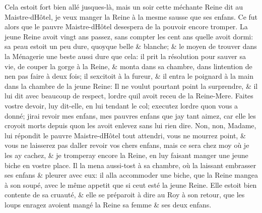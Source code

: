 \documentclass[14pt,a4paper]{memoir}
\begin{document}
\begin{otherlanguage}{french}
Cela estoit fort bien allé jusques-là, mais un soir cette méchante Reine
dit au Maistre-d\textquotesingle Hôtel, je veux manger la Reine à la
mesme sausse que ses enfans. Ce fut alors que le pauvre
Maistre-d\textquotesingle Hôtel desespera de la pouvoir encore tromper.
La jeune Reine avoit vingt ans passez, sans compter les cent ans
qu\textquotesingle elle avoit dormi: sa peau estoit un peu dure, quoyque
belle \& blanche; \& le moyen de trouver dans la Ménagerie une beste
aussi dure que cela: il prit la résolution pour sauver sa vie, de couper
la gorge à la Reine, \& monta dans sa chambre, dans
l\textquotesingle intention de n\textquotesingle en pas faire à deux
fois; il s\textquotesingle excitoit à la fureur, \& il entra le poignard
à la main dans la chambre de la jeune Reine: Il ne voulut pourtant point
la surprendre, \& il lui dit avec beaucoup de respect,
l\textquotesingle ordre qu\textquotesingle il avoit receu de la
Reine-Mere. Faites vostre devoir, luy dit-elle, en lui tendant le col;
executez l\textquotesingle ordre qu\textquotesingle on vous a donné;
j\textquotesingle irai revoir mes enfans, mes pauvres enfans que
j\textquotesingle ay tant aimez, car elle les croyoit morts depuis
qu\textquotesingle on les avoit enlevez sans lui rien dire. Non, non,
Madame, lui répondit le pauvre Maistre-d\textquotesingle Hôtel tout
attendri, vous ne mourrez point, \& vous ne laisserez pas
d\textquotesingle aller revoir vos chers enfans, mais ce sera chez moy
où je les ay cachez, \& je tromperay encore la Reine, en luy faisant
manger une jeune biche en vostre place. Il la mena aussi-tost à sa
chambre, où la laissant embrasser ses enfans \& pleurer avec eux: il
alla accommoder une biche, que la Reine mangea à son soupé, avec le même
appetit que si c\textquotesingle eut esté la jeune Reine. Elle estoit
bien contente de sa cruauté, \& elle se préparoit à dire au Roy à son
retour, que les loups enragez avoient mangé la Reine sa femme \& ses
deux enfans.


\end{otherlanguage}
\end{document}
